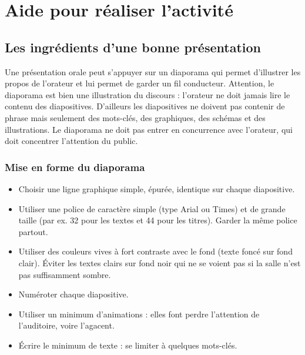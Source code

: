 



\newpage

\section{Aide pour réaliser l'activité}\label{aidePresentation}

\subsection{Les ingrédients d'une bonne présentation}

Une présentation orale peut s'appuyer sur un diaporama qui permet d'illustrer les propos de l'orateur et lui permet de garder un fil conducteur. Attention, le diaporama est bien une illustration du discours : l'orateur ne doit jamais lire le contenu des diapositives. D'ailleurs les diapositives ne doivent pas contenir de phrase mais seulement des mots-clés, des graphiques, des schémas et des illustrations. Le diaporama ne doit pas entrer en concurrence avec l'orateur, qui doit concentrer l'attention du public.

\subsubsection{Mise en forme du diaporama}

\begin{itemize}
\item Choisir une ligne graphique simple, épurée, identique sur chaque diapositive.
\item Utiliser une police de caractère simple (type Arial ou Times) et de grande taille (par ex. 32 pour les textes et 44 pour les titres). Garder la même police partout.
\item Utiliser des couleurs vives à fort contraste avec le fond (texte foncé sur fond clair). Éviter les textes clairs sur fond noir qui ne se voient pas si la salle n'est pas suffisamment sombre.
\item Numéroter chaque diapositive.
\item Utiliser un minimum d'animations : elles font perdre l'attention de l'auditoire, voire l'agacent.
\item Écrire le minimum de texte : se limiter à quelques mots-clés.
\end{itemize}

